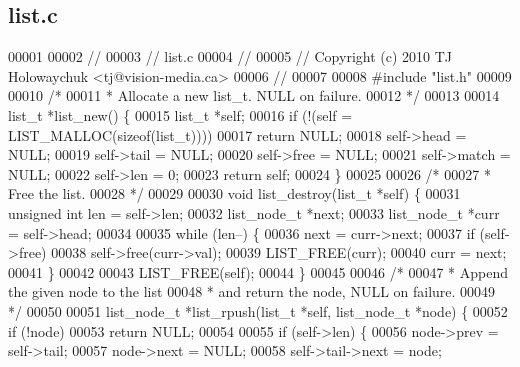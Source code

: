 \subsection{list.\+c}
\label{a00110_source}

\begin{DoxyCode}
00001 
00002 \textcolor{comment}{//}
00003 \textcolor{comment}{// list.c}
00004 \textcolor{comment}{//}
00005 \textcolor{comment}{// Copyright (c) 2010 TJ Holowaychuk <tj@vision-media.ca>}
00006 \textcolor{comment}{//}
00007 
00008 \textcolor{preprocessor}{#include "list.h"}
00009 
00010 \textcolor{comment}{/*}
00011 \textcolor{comment}{ * Allocate a new list\_t. NULL on failure.}
00012 \textcolor{comment}{ */}
00013 
00014 list_t *list_new() \{
00015   list_t *\textcolor{keyword}{self};
00016   \textcolor{keywordflow}{if} (!(\textcolor{keyword}{self} = LIST_MALLOC(\textcolor{keyword}{sizeof}(list_t))))
00017     \textcolor{keywordflow}{return} NULL;
00018   \textcolor{keyword}{self}->head = NULL;
00019   \textcolor{keyword}{self}->tail = NULL;
00020   \textcolor{keyword}{self}->free = NULL;
00021   \textcolor{keyword}{self}->match = NULL;
00022   \textcolor{keyword}{self}->len = 0;
00023   \textcolor{keywordflow}{return} \textcolor{keyword}{self};
00024 \}
00025 
00026 \textcolor{comment}{/*}
00027 \textcolor{comment}{ * Free the list.}
00028 \textcolor{comment}{ */}
00029 
00030 \textcolor{keywordtype}{void} list_destroy(list_t *\textcolor{keyword}{self}) \{
00031   \textcolor{keywordtype}{unsigned} \textcolor{keywordtype}{int} len = \textcolor{keyword}{self}->len;
00032   list_node_t *next;
00033   list_node_t *curr = \textcolor{keyword}{self}->head;
00034 
00035   \textcolor{keywordflow}{while} (len--) \{
00036     next = curr->next;
00037     \textcolor{keywordflow}{if} (self->free)
00038       \textcolor{keyword}{self}->free(curr->val);
00039     LIST_FREE(curr);
00040     curr = next;
00041   \}
00042 
00043   LIST_FREE(\textcolor{keyword}{self});
00044 \}
00045 
00046 \textcolor{comment}{/*}
00047 \textcolor{comment}{ * Append the given node to the list}
00048 \textcolor{comment}{ * and return the node, NULL on failure.}
00049 \textcolor{comment}{ */}
00050 
00051 list_node_t *list_rpush(list_t *\textcolor{keyword}{self}, list_node_t *node) \{
00052   \textcolor{keywordflow}{if} (!node)
00053     \textcolor{keywordflow}{return} NULL;
00054 
00055   \textcolor{keywordflow}{if} (self->len) \{
00056     node->prev = \textcolor{keyword}{self}->tail;
00057     node->next = NULL;
00058     \textcolor{keyword}{self}->tail->next = node;

\end{DoxyCode}
